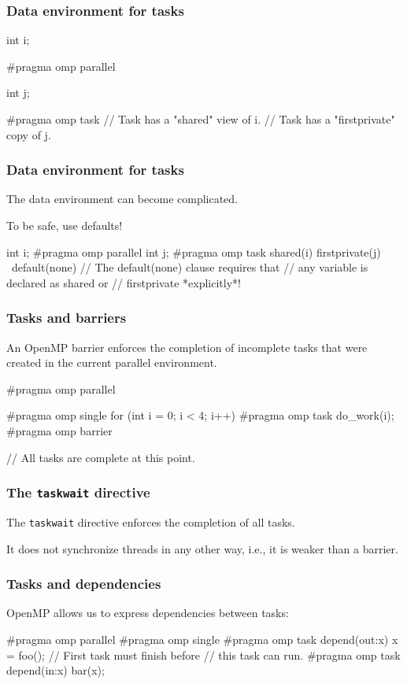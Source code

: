 \documentclass[12pt,t]{beamer}
\let\emph\relax %
\begin{document}
  \begin{frame}[fragile]
    \frametitle{Data environment for tasks}

    \begin{code}
int i;

#pragma omp parallel
{
  int j;

  #pragma omp task
  {
    // Task has a "shared" view of i.
    // Task has a "firstprivate" copy of j.
  }
}
    \end{code}
  \end{frame}

  \begin{frame}[fragile]
    \frametitle{Data environment for tasks}

    The data environment can become complicated.

    To be safe, use defaults!

    \begin{code}
int i;
#pragma omp parallel
{
  int j;
  #pragma omp task shared(i) firstprivate(j) \
                   default(none)
  {
    // The default(none) clause requires that
    // any variable is declared as shared or
    // firstprivate *explicitly*!
  }
}
    \end{code}
  \end{frame}

  \begin{frame}[fragile]
    \frametitle{Tasks and barriers}

    An OpenMP barrier enforces the completion of \emph{all} incomplete tasks that were created in the current parallel environment.

    \begin{code}
#pragma omp parallel
{
  #pragma omp single
  for (int i = 0; i < 4; i++) {
    #pragma omp task
    do_work(i);
  }
  #pragma omp barrier

  // All tasks are complete at this point.
}
    \end{code}
  \end{frame}

  \begin{frame}[fragile]
    \frametitle{The \texttt{taskwait} directive}

    The \texttt{taskwait} directive enforces the completion of all \emph{child} tasks.

    It does not synchronize threads in any other way, i.e., it is weaker than a barrier.
  \end{frame}

  \begin{frame}[fragile]
    \frametitle{Tasks and dependencies}

    OpenMP allows us to express dependencies between tasks:
    \begin{code}
#pragma omp parallel
{
  #pragma omp single
  {
    #pragma omp task depend(out:x)
    x = foo();
    // First task must finish before
    // this task can run.
    #pragma omp task depend(in:x)
    bar(x);
  }
}
    \end{code}
  \end{frame}
\end{document}
